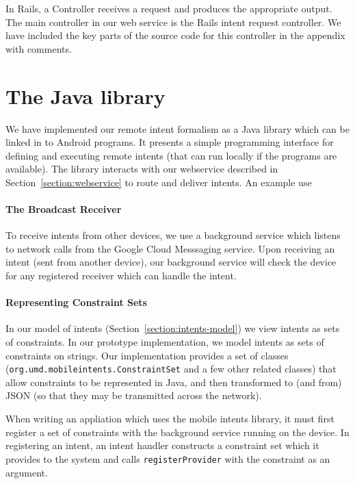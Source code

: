 \documentclass{acm_proc_article-sp}
\begin{document}
In Rails, a Controller receives a request and produces the appropriate output. 
The main controller in our web service is the Rails intent request controller. 
We have included the key parts of the source code for this controller in the 
appendix with comments.


\section{The Java library}

We have implemented our remote intent formalism as a Java library
which can be linked in to Android programs.  It presents a simple
programming interface for defining and executing remote intents (that
can run locally if the programs are available).  The library interacts
with our webservice described in Section~\ref{section:webservice} to
route and deliver intents.  An example use 

\paragraph{The Broadcast Receiver}
To receive intents from other devices, we use a background service
which listens to network calls from the Google Cloud Messsaging
service.  Upon receiving an intent (sent from another device), our
background service will check the device for any registered receiver
which can handle the intent.

\paragraph{Representing Constraint Sets}

In our model of intents (Section~\ref{section:intents-model}) we view
intents as sets of constraints.  In our prototype implementation, we
model intents as sets of constraints on strings.  Our implementation
provides a set of classes
(\texttt{org.umd.mobileintents.ConstraintSet} and a few other related
classes) that allow constraints to be represented in Java, and then
transformed to (and from) JSON (so that they may be transmitted across
the network).

When writing an appliation which uses the mobile intents library, it
must first register a set of constraints with the background service
running on the device.  In registering an intent, an intent handler
constructs a constraint set which it provides to the system and calls
\texttt{registerProvider} with the constraint as an argument.
\end{document}
